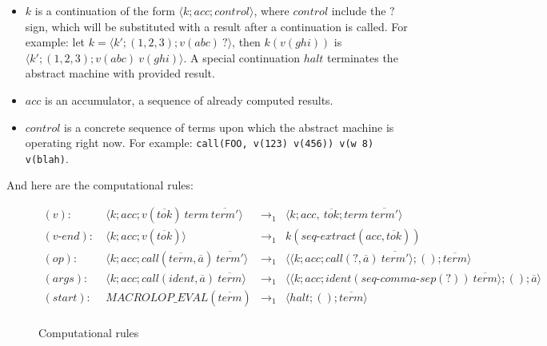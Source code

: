 \documentclass[a4paper, 12pt]{article}
\theoremstyle{break}
\begin{document}
\begin{itemize}
    \item $k$ is a continuation of the form $\langle k; acc; control \rangle$, where
    $control$ include the $?$ sign, which will be substituted with a result after a
    continuation is called. For example: let $k = \langle k'; (1, 2, 3); v(abc) \ ? \rangle$,
    then $k(v(ghi))$ is $\langle k'; (1, 2, 3); v(abc) \ v(ghi) \rangle$. A special
    continuation $halt$ terminates the abstract machine with provided result.

    \item $acc$ is an accumulator, a sequence of already computed results.

    \item $control$ is a concrete sequence of terms upon which the abstract machine is
    operating right now. For example: \texttt{call(FOO, v(123) v(456)) v(w 8) v(blah)}.
\end{itemize}

And here are the computational rules:

\begin{figure}[H]
    \caption{Computational rules}

    \begin{align*}
        (v): \ & \langle k; acc; v(\overline{tok}) \ term \ \overline{term'} \rangle & \to_1 &
            \langle k; acc, \ \overline{tok}; term \ \overline{term'} \rangle \\
        (v\mbox{-}end): \ & \langle k; acc; v(\overline{tok}) \rangle & \to_1 &
            k(seq\mbox{-}extract(acc, \overline{tok})) \\
        (op): \ & \langle k; acc; call(\overline{term}, \overline{a}) \ \overline{term'} \rangle & \to_1 &
            \langle \langle k; acc; call(?, \overline{a}) \ \overline{term'} \rangle; (); \overline{term} \rangle \\
        (args): \ & \langle k; acc; call(ident, \overline{a}) \ \overline{term} \rangle & \to_1 &
            \langle \langle k; acc; ident(seq\mbox{-}comma\mbox{-}sep(?)) \ \overline{term} \rangle; (); \overline{a} \rangle \\
        (start): \ & MACROLOP\_EVAL(\overline{term}) & \to_1 &
            \langle halt; (); \overline{term} \rangle \\
    \end{align*}
\end{figure}
\end{document}

